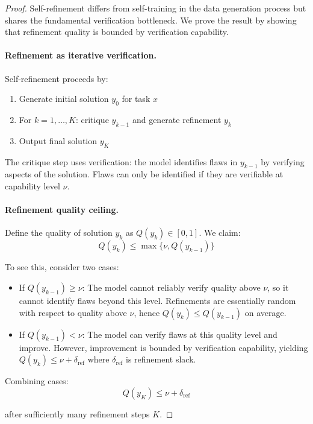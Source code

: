 \documentclass{article}
\theoremstyle{definition}
\theoremstyle{remark}
\begin{document}
\begin{proof}
Self-refinement differs from self-training in the data generation process but shares the fundamental verification bottleneck. We prove the result by showing that refinement quality is bounded by verification capability.

\paragraph{Refinement as iterative verification.}
Self-refinement proceeds by:
\begin{enumerate}
\item Generate initial solution \(y_0\) for task \(x\)
\item For \(k = 1, \ldots, K\): critique \(y_{k-1}\) and generate refinement \(y_k\)
\item Output final solution \(y_K\)
\end{enumerate}

The critique step uses verification: the model identifies flaws in \(y_{k-1}\) by verifying aspects of the solution. Flaws can only be identified if they are verifiable at capability level \(\nu\).

\paragraph{Refinement quality ceiling.}
Define the quality of solution \(y_k\) as \(Q(y_k) \in [0,1]\). We claim:
\[
Q(y_k) \leq \max\{\nu, Q(y_{k-1})\}
\]

To see this, consider two cases:
\begin{itemize}
\item If \(Q(y_{k-1}) \geq \nu\): The model cannot reliably verify quality above \(\nu\), so it cannot identify flaws beyond this level. Refinements are essentially random with respect to quality above \(\nu\), hence \(Q(y_k) \leq Q(y_{k-1})\) on average.

\item If \(Q(y_{k-1}) < \nu\): The model can verify flaws at this quality level and improve. However, improvement is bounded by verification capability, yielding \(Q(y_k) \leq \nu + \delta_{\text{ref}}\) where \(\delta_{\text{ref}}\) is refinement slack.
\end{itemize}

Combining cases:
\[
Q(y_K) \leq \nu + \delta_{\text{ref}}
\]

after sufficiently many refinement steps \(K\).


\end{proof}
\end{document}
